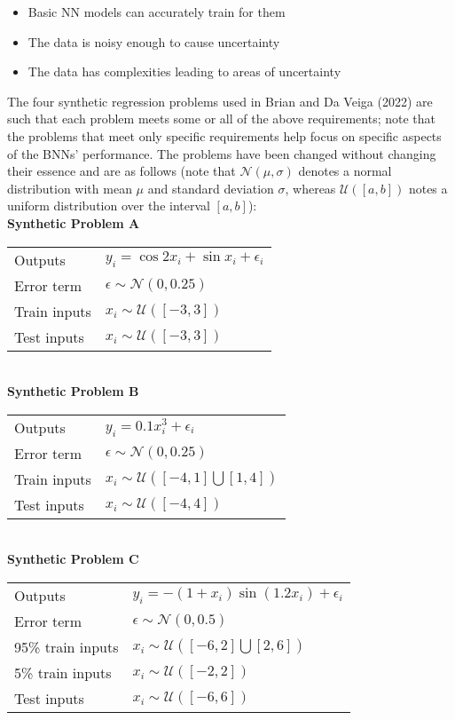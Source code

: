 \documentclass[conference]{IEEEtran}
\begin{document}
\begin{itemize}
    \item Basic NN models can accurately train for them
    \item The data is noisy enough to cause uncertainty
    \item The data has complexities leading to areas of uncertainty\\
\end{itemize}

The four synthetic regression problems used in Brian and Da Veiga (2022) are such that each problem meets some or all of the above requirements; note that the problems that meet only specific requirements help focus on specific aspects of the BNNs' performance. The problems have been changed without changing their essence and are as follows (note that $\mathcal{N}(\mu, \sigma)$ denotes a normal distribution with mean $\mu$ and standard deviation $\sigma$, whereas $\mathcal{U}([a, b])$ notes a uniform distribution over the interval $[a, b]$):\\

\textbf{Synthetic Problem A}

\begin{tabular}{m{2.5cm} | m{6cm}}
    Outputs & $y_i = \cos{2x_i} + \sin{x_i} + \epsilon_i$ \\
    Error term & $\epsilon \sim \mathcal{N}(0, 0.25)$ \\
    Train inputs & $x_i \sim \mathcal{U}([-3, 3])$ \\
    Test inputs & $x_i \sim \mathcal{U}([-3, 3])$
\end{tabular} \\

\textbf{Synthetic Problem B}

\begin{tabular}{m{2.5cm} | m{6cm}}
    Outputs & $y_i = 0.1x_i^3 + \epsilon_i$ \\
    Error term & $\epsilon \sim \mathcal{N}(0, 0.25)$ \\
    Train inputs & $x_i \sim \mathcal{U}([-4, 1] \bigcup [1, 4])$ \\
    Test inputs & $x_i \sim \mathcal{U}([-4, 4])$
\end{tabular} \\

\textbf{Synthetic Problem C}

\begin{tabular}{m{2.5cm} | m{6cm}}
    Outputs & $y_i = -(1 + x_i)\sin(1.2x_i) + \epsilon_i$ \\
    Error term & $\epsilon \sim \mathcal{N}(0, 0.5)$ \\
    95\% train inputs & $x_i \sim \mathcal{U}([-6, 2] \bigcup [2, 6])$ \\
    5\% train inputs & $x_i \sim \mathcal{U}([-2, 2])$ \\
    Test inputs & $x_i \sim \mathcal{U}([-6, 6])$
\end{tabular} \\
\end{document}
